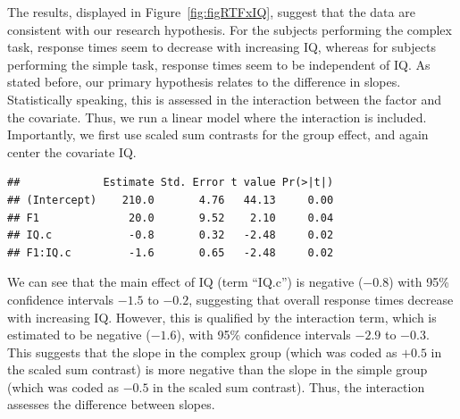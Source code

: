 \documentclass[
  12pt,
]{krantz}
\newenvironment{Shaded}{\begin{snugshade}}{\end{snugshade}}
\newcommand{\AttributeTok}[1]{\textcolor[rgb]{0.77,0.63,0.00}{#1}}
\newcommand{\DecValTok}[1]{\textcolor[rgb]{0.00,0.00,0.81}{#1}}
\newcommand{\FloatTok}[1]{\textcolor[rgb]{0.00,0.00,0.81}{#1}}
\newcommand{\FunctionTok}[1]{\textcolor[rgb]{0.00,0.00,0.00}{#1}}
\newcommand{\NormalTok}[1]{#1}
\newcommand{\OtherTok}[1]{\textcolor[rgb]{0.56,0.35,0.01}{#1}}
\newcommand{\SpecialCharTok}[1]{\textcolor[rgb]{0.00,0.00,0.00}{#1}}
\theoremstyle{definition}
\theoremstyle{definition}
\theoremstyle{definition}
\theoremstyle{definition}
\theoremstyle{remark}
\begin{document}
The results, displayed in Figure~\ref{fig:figRTFxIQ}, suggest that the data are consistent with our research hypothesis. For the subjects performing the complex task, response times seem to decrease with increasing IQ, whereas for subjects performing the simple task, response times seem to be independent of IQ. As stated before, our primary hypothesis relates to the difference in slopes. Statistically speaking, this is assessed in the interaction between the factor and the covariate. Thus, we run a linear model where the interaction is included. Importantly, we first use scaled sum contrasts for the group effect, and again center the covariate IQ.

\begin{Shaded}
\end{Shaded}

\begin{Shaded}
\end{Shaded}

\begin{verbatim}
##             Estimate Std. Error t value Pr(>|t|)
## (Intercept)    210.0       4.76   44.13     0.00
## F1              20.0       9.52    2.10     0.04
## IQ.c            -0.8       0.32   -2.48     0.02
## F1:IQ.c         -1.6       0.65   -2.48     0.02
\end{verbatim}

We can see that the main effect of IQ (term ``IQ.c'') is negative (\(-0.8\)) with 95\% confidence intervals \(-1.5\) to \(-0.2\), suggesting that overall response times decrease with increasing IQ. However, this is qualified by the interaction term, which is estimated to be negative (\(-1.6\)), with 95\% confidence intervals \(-2.9\) to \(-0.3\). This suggests that the slope in the complex group (which was coded as \(+0.5\) in the scaled sum contrast) is more negative than the slope in the simple group (which was coded as \(-0.5\) in the scaled sum contrast). Thus, the interaction assesses the difference between slopes.
\end{document}
